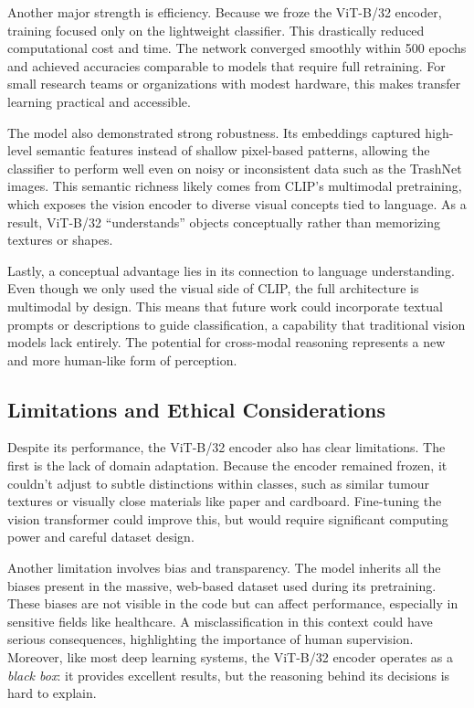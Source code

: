 \documentclass[12pt]{article}
\begin{document}
Another major strength is efficiency. Because we froze the ViT-B/32 encoder, training focused only on the lightweight classifier. This drastically reduced computational cost and time. The network converged smoothly within 500 epochs and achieved accuracies comparable to models that require full retraining. For small research teams or organizations with modest hardware, this makes transfer learning practical and accessible.

The model also demonstrated strong robustness. Its embeddings captured high-level semantic features instead of shallow pixel-based patterns, allowing the classifier to perform well even on noisy or inconsistent data such as the TrashNet images. This semantic richness likely comes from CLIP’s multimodal pretraining, which exposes the vision encoder to diverse visual concepts tied to language. As a result, ViT-B/32 “understands” objects conceptually rather than memorizing textures or shapes.

Lastly, a conceptual advantage lies in its connection to language understanding. Even though we only used the visual side of CLIP, the full architecture is multimodal by design. This means that future work could incorporate textual prompts or descriptions to guide classification, a capability that traditional vision models lack entirely. The potential for cross-modal reasoning represents a new and more human-like form of perception.

\subsection{Limitations and Ethical Considerations}
Despite its performance, the ViT-B/32 encoder also has clear limitations. The first is the lack of domain adaptation. Because the encoder remained frozen, it couldn’t adjust to subtle distinctions within classes, such as similar tumour textures or visually close materials like paper and cardboard. Fine-tuning the vision transformer could improve this, but would require significant computing power and careful dataset design.

Another limitation involves bias and transparency. The model inherits all the biases present in the massive, web-based dataset used during its pretraining. These biases are not visible in the code but can affect performance, especially in sensitive fields like healthcare. A misclassification in this context could have serious consequences, highlighting the importance of human supervision. Moreover, like most deep learning systems, the ViT-B/32 encoder operates as a \textit{black box}: it provides excellent results, but the reasoning behind its decisions is hard to explain.
\end{document}
